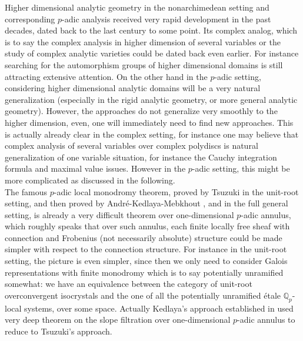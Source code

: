 \documentclass[12pt]{amsart}
\theoremstyle{definition}
\numberwithin{equation}{section}
\begin{document}
Higher dimensional analytic geometry in the nonarchimedean setting and corresponding $p$-adic analysis received very rapid development in the past decades, dated back to the last century to some point. Its complex analog, which is to say the complex analysis in higher dimension of several variables or the study of complex analytic varieties could be dated back even earlier. For instance searching for the automorphism groups of higher dimensional domains is still attracting extensive attention. On the other hand in the $p$-adic setting, considering higher dimensional analytic domains will be a very natural generalization (especially in the rigid analytic geometry, or more general analytic geometry). However, the approaches do not generalize very smoothly to the higher dimension, even, one will immediately need to find new approaches. This is actually already clear in the complex setting, for instance one may believe that complex analysis of several variables over complex polydiscs is natural generalization of one variable situation, for instance the Cauchy integration formula and maximal value issues. However in the $p$-adic setting, this might be more complicated as discussed in the following.\\


\indent The famous $p$-adic local monodromy theorem, proved by Tsuzuki in the unit-root setting, and then proved by Andr\'e-Kedlaya-Mebkhout \cite{Ked1}, \cite{And1} and \cite{Me} in the full general setting, is already a very difficult theorem over one-dimensional $p$-adic annulus, which roughly speaks that over such annulus, each finite locally free sheaf with connection and Frobenius (not necessarily absolute) structure could be made simpler with respect to the connection structure. For instance in the unit-root setting, the picture is even simpler, since then we only need to consider Galois representations with finite monodromy which is to say potentially unramified somewhat: we have an equivalence between the category of unit-root overconvergent isocrystals and the one of all the potentially unramified \'etale $\mathbb{Q}_p$-local systems, over some space. Actually Kedlaya's approach established in \cite{Ked1} used very deep theorem on the slope filtration over one-dimensional $p$-adic annulus to reduce to Tsuzuki's approach.\\
\end{document}
